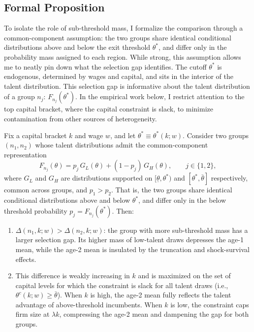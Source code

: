     \subsection{Formal Proposition}
    To isolate the role of sub-threshold mass, I formalize the comparison through a common-component assumption: the two groups share identical conditional distributions above and below the exit threshold $\theta^{*}$, and differ only in the probability mass assigned to each region. While strong, this assumption allows me to neatly pin down what the selection gap identifies. The cutoff $\theta^{*}$ is endogenous, determined by wages and capital, and sits in the interior of the talent distribution. This selection gap is informative about the talent distribution of a group $n_j$: $F_{n_{j}}(\theta^{*})$. In the empirical work below, I restrict attention to the top capital bracket, where the capital constraint is slack, to minimize contamination from other sources of heterogeneity.

    
    \begin{proposition}\label{prop:selgap}
Fix a capital bracket $k$ and wage $w$, and let $\theta^{*} \equiv \theta^{*}(k; w)$. Consider two groups $(n_1, n_2)$ whose talent distributions admit the common-component representation
\begin{equation}
F_{n_j}(\theta) = p_j\, G_L(\theta) + (1 - p_j)\, G_H(\theta), \qquad j \in \{1, 2\},
\label{eq:mixture}
\end{equation}
where $G_L$ and $G_H$ are distributions supported on $[\underline{\theta}, \theta^{*})$ and $[\theta^{*}, \bar{\theta}]$ respectively, common across groups, and $p_1 > p_2$. That is, the two groups share identical conditional distributions above and below $\theta^{*}$, and differ only in the below threshold probability $p_j = F_{n_j}(\theta^{*})$. Then:
\begin{enumerate}
    \item $\Delta(n_1, k; w) > \Delta(n_2, k; w)$: the group with more sub-threshold mass has a larger selection gap. Its higher mass of low-talent draws depresses the age-1 mean, while the age-2 mean is insulated by the truncation and shock-survival effects.
    
    \item This difference is weakly increasing in $k$ and is maximized on the set of capital levels for which the constraint is slack for all talent draws (i.e., $\theta^{c}(k; w) \geq \bar{\theta}$). When $k$ is high, the age-2 mean fully reflects the talent advantage of above-threshold incumbents. When $k$ is low, the constraint caps firm size at $\lambda k$, compressing the age-2 mean and dampening the gap for both groups.
\end{enumerate}
\end{proposition}
    
